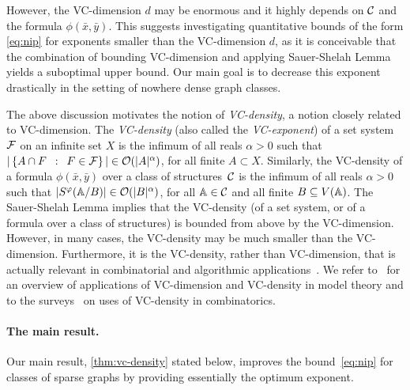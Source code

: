 However, the VC-dimension $d$ may be enormous and it highly depends on $\cal C$ and the formula $\phi(\bar x,\bar y)$.
This suggests investigating quantitative bounds of the form \eqref{eq:nip} for exponents smaller than the VC-dimension $d$, as it is conceivable that the combination of bounding VC-dimension and applying
Sauer-Shelah Lemma yields a suboptimal upper bound. Our main goal is to decrease this exponent drastically in the setting of nowhere dense graph classes.

The above discussion motivates the notion of \emph{VC-density}, a notion closely related to VC-dimension.
The \emph{VC-density} (also called the 
\emph{VC-exponent})
of a set system $\cal F$
on an infinite set $X$ is the infimum of all reals $\alpha>0$ such that 
$|\setof{A\cap F}{F\in \cal F}|\in \Oof(|A|^\alpha)$, for all finite $A\subset X$. 
Similarly, the VC-density of a formula $\phi(\bar x,\bar y)$ over a class of structures~$\cal C$
is the infimum of all reals $\alpha>0$
such that $|S^\phi(\str A/B)|\in \Oof(|B|^\alpha)$,
for all $\str A\in \cal C$ and all finite $B\subset V(\str A)$.
The Sauer-Shelah Lemma
implies that the VC-density (of a set system, or of a formula over a class of structures) is bounded from above by the VC-dimension. 
However, in many cases, the VC-density may be much smaller than the VC-dimension. Furthermore, it is the VC-density, rather than VC-dimension, that is actually relevant in combinatorial
and algorithmic applications~\cite{Bronnimann1995,matouvsek1998geometric,Matousek:2004:BVI:1005787.1005789}.
We refer to~\cite{aschenbrenner2016vapnik} for an overview of 
applications of VC-dimension and VC-density in model
theory and to the surveys~\cite{furedi1991traces,matouvsek1998geometric} 
on uses of VC-density in
combinatorics. 

\paragraph{The main result.}
Our main result, \cref{thm:vc-density} stated below, improves the bound~\eqref{eq:nip} for classes of sparse graphs
by providing essentially the optimum exponent.

